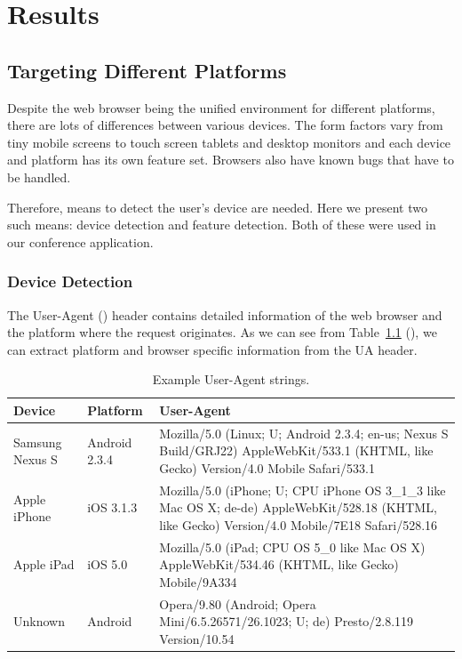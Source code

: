 \chapter{Results}
\label{chapter:results}

\section{Targeting Different Platforms}
\label{section:targeting-platforms}

Despite the web browser being the unified environment for different
platforms, there are lots of differences between various devices. The
form factors vary from tiny mobile screens to touch screen tablets and
desktop monitors and each device and platform has its own feature
set. Browsers also have known bugs that have to be handled.

Therefore, means to detect the user's device are needed. Here we
present two such means: device detection and feature detection. Both
of these were used in our conference application.

\subsection{Device Detection}
\label{subsection:device-detection}

The User-Agent ()  header contains detailed
information of the web browser and the platform where the request
originates. As we can see from Table~\ref{table:user-agents}
(), we can extract platform and browser
specific information from the UA header.

\begin{table}
  \begin{tabular}{ l | l | p{7cm} }
    \textbf{Device} & \textbf{Platform} & \textbf{User-Agent} \\ \hline
    Samsung Nexus S & Android 2.3.4 & Mozilla/5.0 (Linux; U; Android 2.3.4; en-us; Nexus S Build/GRJ22) AppleWebKit/533.1 (KHTML, like Gecko) Version/4.0 Mobile Safari/533.1 \\ \hline
    Apple iPhone & iOS 3.1.3 & Mozilla/5.0 (iPhone; U; CPU iPhone OS 3\_1\_3 like Mac OS X; de-de) AppleWebKit/528.18 (KHTML, like Gecko) Version/4.0 Mobile/7E18 Safari/528.16 \\ \hline
    Apple iPad & iOS 5.0 & Mozilla/5.0 (iPad; CPU OS 5\_0 like Mac OS X) AppleWebKit/534.46 (KHTML, like Gecko) Mobile/9A334 \\ \hline
    Unknown & Android & Opera/9.80 (Android; Opera Mini/6.5.26571/26.1023; U; de) Presto/2.8.119 Version/10.54 \\ \hline
  \end{tabular}
  \label{table:user-agents}
  \caption{Example User-Agent strings.}
\end{table}

